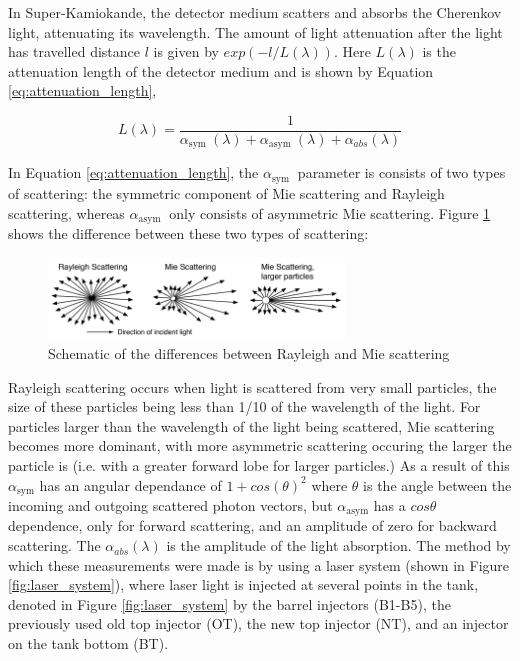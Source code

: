 In Super-Kamiokande, the detector medium scatters and absorbs the Cherenkov light, attenuating its wavelength. The amount of light attenuation after the light has travelled distance $l$ is given by $exp(-l/L(\lambda))$. Here $L(\lambda)$ is the attenuation length of the detector medium and is shown by Equation \ref{eq:attenuation_length}, 

\begin{equation}
L(\lambda)=\frac{1}{\alpha_{\text {sym }}(\lambda)+\alpha_{\text {asym }}(\lambda)+\alpha_{a b s}(\lambda)}
\label{eq:attenuation_length}
\end{equation}

In Equation \ref{eq:attenuation_length}, the $\alpha_{\text {sym }}$ parameter is consists of two types of scattering: the symmetric component of Mie scattering and Rayleigh scattering, whereas $\alpha_{\text {asym }}$ only consists of asymmetric Mie scattering.   Figure \ref{fig:rayleigh_mie} shows the difference between these two types of scattering:

\begin{figure}
    \centering
    \includegraphics[width=0.7\textwidth]{Figures/rayleigh_mie.png}
    \caption{Schematic of the differences between Rayleigh and Mie scattering}
    \label{fig:rayleigh_mie}
\end{figure}

Rayleigh scattering occurs when light is scattered from very small particles, the size of these particles being less than 1/10 of the wavelength of the light. For particles larger than the wavelength of the light being scattered, Mie scattering becomes more dominant, with more asymmetric scattering occuring the larger the particle is (i.e. with a greater forward lobe for larger particles.) As a result of this $\alpha_{\text {sym}}$ has an angular dependance of $1 + cos(\theta)^2$ where $\theta$ is the angle between the incoming and outgoing scattered photon vectors, but $\alpha_{\text {asym}}$ has a $cos\theta$ dependence, only for forward scattering, and an amplitude of zero for backward scattering. The $\alpha_{abs}(\lambda)$ is the amplitude of the light absorption. The method by which these measurements were made is by using a laser system (shown in Figure \ref{fig:laser_system}),  where laser light is injected at several points in the tank, denoted in Figure \ref{fig:laser_system} by the barrel injectors (B1-B5), the previously used old top injector (OT), the new top injector (NT), and an injector on the tank bottom (BT). 

